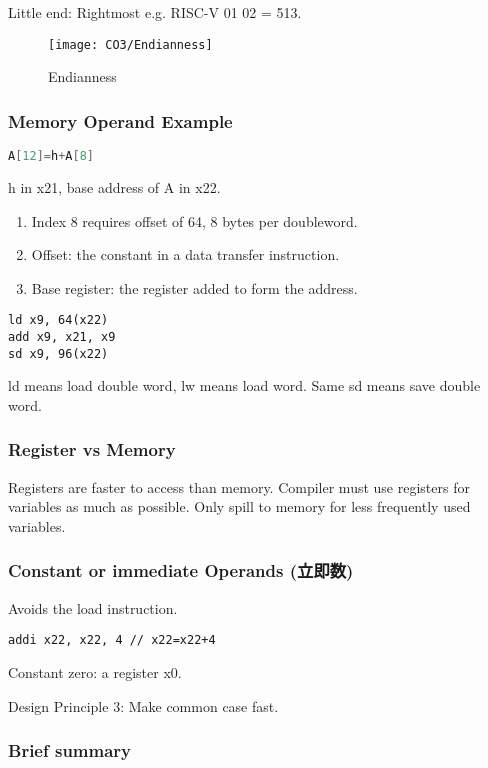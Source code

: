 Little end: Rightmost e.g. RISC-V 01 02 = 513. 

\begin{figure}[!htb]
    \centering
    \texttt{[image: CO3/Endianness]}
    \caption{Endianness}
\end{figure}

\subsubsection{Memory Operand Example}
\begin{lstlisting}[language={C},title={C code}]
A[12]=h+A[8]
\end{lstlisting}
h in x21, base address of A in x22. 

\begin{enumerate}
    \item Index 8 requires offset of 64, 8 bytes per doubleword. 
    \item  Offset: the constant in a data transfer instruction. 
    \item  Base register: the register added to form the address. 
\end{enumerate}
\begin{lstlisting}[language={[x86masm]Assembler},title={Compiled RISC-V code}]
ld x9, 64(x22)
add x9, x21, x9
sd x9, 96(x22)
\end{lstlisting}
ld means load double word, lw means load word. Same sd means save double word. 

\subsubsection{Register vs Memory}
Registers are faster to access than memory. Compiler must use registers for variables as much as possible. Only spill to memory for less frequently used variables. 

\subsubsection{Constant or immediate Operands (立即数)}
Avoids the load instruction. 
\begin{lstlisting}[language={[x86masm]Assembler},title={Compiled RISC-V code}]
addi x22, x22, 4 // x22=x22+4
\end{lstlisting}
Constant zero: a register x0. 

Design Principle 3: Make common case fast. 

\subsubsection{Brief summary}

